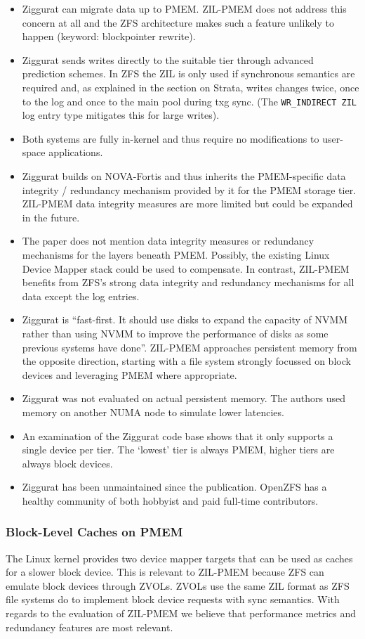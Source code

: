 \documentclass[12pt,a4paper,twoside,draft]{book}
\begin{document}
\begin{itemize}
    \item Ziggurat can migrate data up to PMEM. ZIL-PMEM does not address this concern at all and the ZFS architecture makes such a feature unlikely to happen (keyword: blockpointer rewrite).
    \item Ziggurat sends writes directly to the suitable tier through advanced prediction schemes. In ZFS the ZIL is only used if synchronous semantics are required and, as explained in the section on Strata, writes changes twice, once to the log and once to the main pool during txg sync. (The \lstinline{WR_INDIRECT ZIL} log entry type mitigates this for large writes).
    \item Both systems are fully in-kernel and thus require no modifications to user-space applications.
    \item Ziggurat builds on NOVA-Fortis and thus inherits the PMEM-specific data integrity / redundancy mechanism provided by it for the PMEM storage tier. ZIL-PMEM data integrity measures are more limited but could be expanded in the future.
    \item The paper does not mention data integrity measures or redundancy mechanisms for the layers beneath PMEM. Possibly, the existing Linux Device Mapper stack could be used to compensate. In contrast, ZIL-PMEM benefits from ZFS’s strong data integrity and redundancy mechanisms for all data except the log entries.
    \item Ziggurat is “fast-first. It should use disks to expand the capacity of NVMM rather than using NVMM to improve the performance of disks as some previous systems have done”. ZIL-PMEM approaches persistent memory from the opposite direction, starting with a file system strongly focussed on block devices and leveraging PMEM where appropriate.
    \item Ziggurat was not evaluated on actual persistent memory. The authors used memory on another NUMA node to simulate lower latencies.
    \item An examination of the Ziggurat code base shows that it only supports a single device per tier. The ‘lowest’ tier is always PMEM, higher tiers are always block devices.
    \item Ziggurat has been unmaintained since the publication. OpenZFS has a healthy community of both hobbyist and paid full-time contributors.
\end{itemize}

\subsubsection{ Block-Level Caches on PMEM}
The Linux kernel provides two device mapper targets that can be used as caches for a slower block device. This is relevant to ZIL-PMEM because ZFS can emulate block devices through ZVOLs. ZVOLs use the same ZIL format as ZFS file systems do to implement block device requests with sync semantics. With regards to the evaluation of ZIL-PMEM we believe that performance metrics and redundancy features are most relevant.
\end{document}
